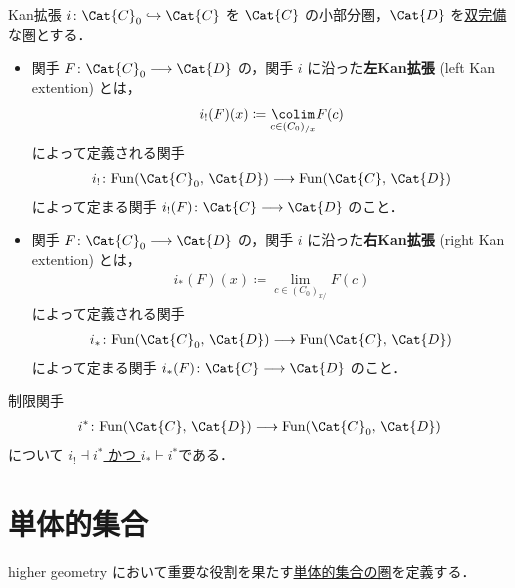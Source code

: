 \documentclass[TQFT_main]{subfiles}
\begin{document}
\begin{mydef}[label=def:Kanext]{Kan拡張}
    $i \colon \Cat{C}_0 \hookrightarrow \Cat{C}$ を $\Cat{C}$ の小部分圏，$\Cat{D}$ を\hyperref[def:complete]{双完備}な圏とする．
    \begin{itemize}
        \item 関手 $F \colon \Cat{C}_0 \lto \Cat{D}$ の，関手 $i$ に沿った\textbf{左Kan拡張} (left Kan extention) とは，
        \begin{align}
            i_{!} (F)(x) \coloneqq \underset{c \in (C_0)_{/x}}{\colim} F(c)
        \end{align}
        によって定義される関手
        \begin{align}
            i_{!} \colon \mathrm{Fun} (\Cat{C}_0,\, \Cat{D}) \lto \mathrm{Fun} (\Cat{C},\, \Cat{D})
        \end{align}
        によって定まる関手 $i_!(F) \colon \Cat{C} \lto \Cat{D}$ のこと． 
        \item   関手 $F \colon \Cat{C}_0 \lto \Cat{D}$ の，関手 $i$ に沿った\textbf{右Kan拡張} (right Kan extention) とは，
        \begin{align}
            i_{*} (F)(x) \coloneqq \underset{c \in (C_0)_{x/}}{\lim} F(c)
        \end{align}
        によって定義される関手
        \begin{align}
            i_{*} \colon \mathrm{Fun} (\Cat{C}_0,\, \Cat{D}) \lto \mathrm{Fun} (\Cat{C},\, \Cat{D})
        \end{align}
        によって定まる関手 $i_*(F) \colon \Cat{C} \lto \Cat{D}$ のこと． 
    \end{itemize}
    
\end{mydef}
制限関手
\begin{align}
    i^* \colon \mathrm{Fun} (\Cat{C},\, \Cat{D}) \lto \mathrm{Fun} (\Cat{C}_0,\, \Cat{D})
\end{align}
について \hyperref[def:adjoint]{$i_{!} \dashv i^*$ かつ $i_* \vdash i^*$}である．

\section{単体的集合}

higher geometry において重要な役割を果たす\hyperref[def:SimpSet]{単体的集合の圏}を定義する．
\end{document}
